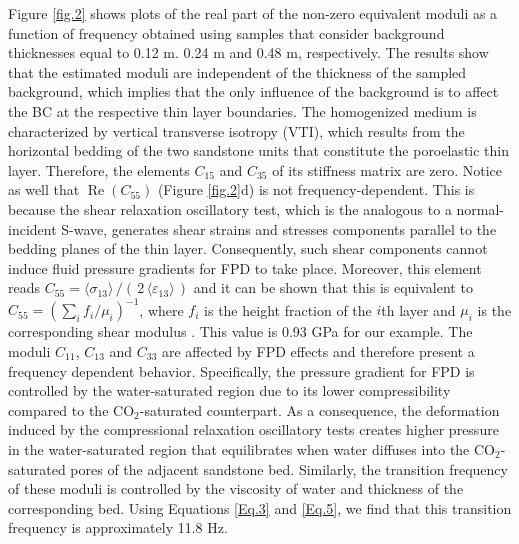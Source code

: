 \documentclass[draft]{agujournal2019}
\renewcommand{\Re}{\operatorname{Re} }
\begin{document}
Figure \ref{fig.2} shows plots of the real part of the non-zero equivalent moduli as a function of frequency obtained using samples that consider background thicknesses equal to 0.12 m. 0.24 m and 0.48 m, respectively. The results show that the estimated moduli are independent of the thickness of the sampled background, which implies that the only influence of the background is to affect the BC at the respective thin layer boundaries. 
The homogenized medium is
characterized by vertical transverse isotropy (VTI), which results from the horizontal bedding of the two sandstone units that constitute the poroelastic thin layer. Therefore, the elements $C_{15}$ and $C_{35}$ of its stiffness matrix are zero. Notice as well that $\Re(C_{55})$  (Figure \ref{fig.2}d) is not frequency-dependent. This is because the shear relaxation oscillatory test, which is the analogous to a normal-incident S-wave, generates shear strains and stresses components  parallel to the bedding planes of the thin layer. Consequently, such shear components cannot induce fluid pressure gradients for FPD to take place. Moreover, this element reads $C_{55} = \langle \sigma_{13}\rangle\,/(\,2\, \langle \varepsilon_{13} \rangle\,)$ and it can be shown that this is equivalent to $C_{55}  =\left( \sum_i f_i/\mu_i \right)^{-1}$, where $f_i$ is the height fraction of the $i$th layer and $\mu_i$ is the corresponding shear modulus \cite{Backus1962, Salamon1968}. This value is 0.93 GPa for our example. The moduli  $C_{11}$, $C_{13}$ and $C_{33}$ are affected by FPD effects and therefore present a frequency dependent behavior. Specifically, the pressure gradient for FPD is controlled by the water-saturated region due to its lower compressibility compared to the CO$_2$-saturated counterpart. As a consequence, the deformation induced by the compressional relaxation oscillatory tests creates higher pressure in the water-saturated region that equilibrates when water diffuses into the CO$_2$-saturated pores of the adjacent sandstone bed. Similarly, the transition frequency of these moduli is controlled by the viscosity of water and thickness of the corresponding bed. Using Equations \eqref{Eq.3} and \eqref{Eq.5}, we find that this transition frequency is approximately 11.8 Hz. 
\end{document}
